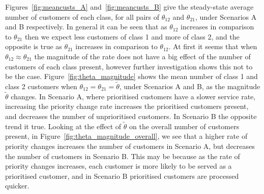 \documentclass{article}
\begin{document}
Figures~\ref{fig:meancusts_A} and~\ref{fig:meancusts_B} give the steady-state
average number of customers of each class, for all pairs of $\theta_{12}$ and
$\theta_{21}$, under Scenarios A and B respectively. In general it can be seen
that as $\theta_{12}$ increases in comparison to $\theta_{21}$ then we expect
less customers of class 1 and more of class 2, and the opposite is true as
$\theta_{21}$ increases in comparison to $\theta_{12}$.
At first it seems that when $\theta_{12} \approx \theta_{21}$ the magnitude of
the rate does not have a big effect of the number of customers of each class
present, however further investigation shows this not to be the case.
Figure~\ref{fig:theta_magnitude} shows the mean number of class 1 and class 2
customers when $\theta_{12} = \theta_{21} = \tilde{\theta}$, under Scenarios A
and B, as the magnitude $\tilde{\theta}$ changes. In Scenario A, where
prioritised customers have a slower service rate, increasing the priority change
rate increases the prioritised customers present, and decreases the number of
unprioritised customers. In Scenario B the opposite trend it true. Looking at
the effect of $\tilde{\theta}$ on the overall number of customers present, in
Figure~\ref{fig:theta_magnitude_overall}, we see that a higher rate of priority
changes increases the number of customers in Scenario A, but decreases the
number of customers in Scenario B. This may be because as the rate of priority
changes increases, each customer is more likely to be served as a prioritised
customer, and in Scenario B prioritised customers are processed quicker.
\end{document}
